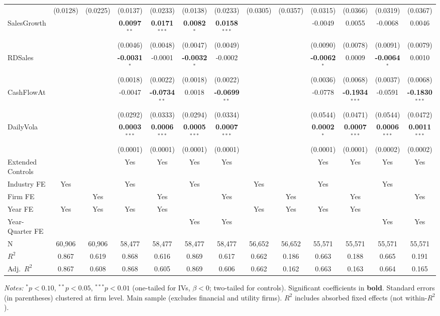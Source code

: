 \documentclass[11pt,a4paper]{article}
\begin{document}
\begin{table}[htbp]
\begin{tabular}{lcccccccccccc}
 & (0.0128) & (0.0225) & (0.0137) & (0.0233) & (0.0138) & (0.0233) & (0.0305) & (0.0357) & (0.0315) & (0.0366) & (0.0319) & (0.0367) \\
SalesGrowth &  &  & \textbf{0.0097}$^{**}$ & \textbf{0.0171}$^{***}$ & \textbf{0.0082}$^{*}$ & \textbf{0.0158}$^{***}$ &  &  & -0.0049 & 0.0055 & -0.0068 & 0.0046 \\
 &  &  & (0.0046) & (0.0048) & (0.0047) & (0.0049) &  &  & (0.0090) & (0.0078) & (0.0091) & (0.0079) \\
RDSales &  &  & \textbf{-0.0031}$^{*}$ & -0.0001 & \textbf{-0.0032}$^{*}$ & -0.0002 &  &  & \textbf{-0.0062}$^{*}$ & 0.0009 & \textbf{-0.0064}$^{*}$ & 0.0010 \\
 &  &  & (0.0018) & (0.0022) & (0.0018) & (0.0022) &  &  & (0.0036) & (0.0068) & (0.0037) & (0.0068) \\
CashFlowAt &  &  & -0.0047 & \textbf{-0.0734}$^{**}$ & 0.0018 & \textbf{-0.0699}$^{**}$ &  &  & -0.0778 & \textbf{-0.1934}$^{***}$ & -0.0591 & \textbf{-0.1830}$^{***}$ \\
 &  &  & (0.0292) & (0.0333) & (0.0294) & (0.0334) &  &  & (0.0544) & (0.0471) & (0.0544) & (0.0472) \\
DailyVola &  &  & \textbf{0.0003}$^{***}$ & \textbf{0.0006}$^{***}$ & \textbf{0.0005}$^{***}$ & \textbf{0.0007}$^{***}$ &  &  & \textbf{0.0002}$^{*}$ & \textbf{0.0007}$^{***}$ & \textbf{0.0006}$^{***}$ & \textbf{0.0011}$^{***}$ \\
 &  &  & (0.0001) & (0.0001) & (0.0001) & (0.0001) &  &  & (0.0001) & (0.0001) & (0.0002) & (0.0002) \\
\midrule
Extended Controls &  &  & Yes & Yes & Yes & Yes &  &  & Yes & Yes & Yes & Yes \\
Industry FE & Yes &  & Yes &  & Yes &  & Yes &  & Yes &  & Yes &  \\
Firm FE &  & Yes &  & Yes &  & Yes &  & Yes &  & Yes &  & Yes \\
Year FE & Yes & Yes & Yes & Yes &  &  & Yes & Yes & Yes & Yes &  &  \\
Year-Quarter FE &  &  &  &  & Yes & Yes &  &  &  &  & Yes & Yes \\
\midrule
N & 60,906 & 60,906 & 58,477 & 58,477 & 58,477 & 58,477 & 56,652 & 56,652 & 55,571 & 55,571 & 55,571 & 55,571 \\
$R^2$ & 0.867 & 0.619 & 0.868 & 0.616 & 0.869 & 0.617 & 0.662 & 0.186 & 0.663 & 0.188 & 0.665 & 0.191 \\
Adj.~$R^2$ & 0.867 & 0.608 & 0.868 & 0.605 & 0.869 & 0.606 & 0.662 & 0.162 & 0.663 & 0.163 & 0.664 & 0.165 \\
\bottomrule
\end{tabular}
\begin{minipage}{\linewidth}
\vspace{2pt}\scriptsize
\textit{Notes:} $^{*}p<0.10$, $^{**}p<0.05$, $^{***}p<0.01$ (one-tailed for IVs, $\beta < 0$; two-tailed for controls).
 Significant coefficients in \textbf{bold}.
 Standard errors (in parentheses) clustered at firm level.
 Main sample (excludes financial and utility firms).
 $R^2$ includes absorbed fixed effects (not within-$R^2$).
\end{minipage}
\end{table}
\end{document}
